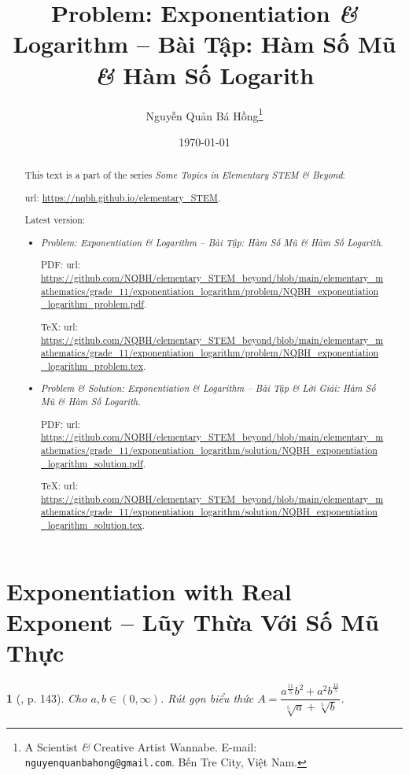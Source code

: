 \documentclass{article}
\title{Problem: Exponentiation {\it\&} Logarithm -- Bài Tập: Hàm Số Mũ {\it\&} Hàm Số Logarith}
\author{Nguyễn Quản Bá Hồng\footnote{A Scientist {\it\&} Creative Artist Wannabe. E-mail: {\tt nguyenquanbahong@gmail.com}. Bến Tre City, Việt Nam.}}
\date{\today}
\newtheorem{baitoan}{}
\begin{document}
\maketitle
\begin{abstract}
	This text is a part of the series {\it Some Topics in Elementary STEM \& Beyond}:
	
	{\sc url}: \url{https://nqbh.github.io/elementary_STEM}.
	
	Latest version:
	\begin{itemize}
		\item {\it Problem: Exponentiation \& Logarithm -- Bài Tập: Hàm Số Mũ \& Hàm Số Logarith}.
		
		PDF: {\sc url}: \url{https://github.com/NQBH/elementary_STEM_beyond/blob/main/elementary_mathematics/grade_11/exponentiation_logarithm/problem/NQBH_exponentiation_logarithm_problem.pdf}.
		
		\TeX: {\sc url}: \url{https://github.com/NQBH/elementary_STEM_beyond/blob/main/elementary_mathematics/grade_11/exponentiation_logarithm/problem/NQBH_exponentiation_logarithm_problem.tex}.
		\item {\it Problem \& Solution: Exponentiation \& Logarithm -- Bài Tập \& Lời Giải: Hàm Số Mũ \& Hàm Số Logarith}.
		
		PDF: {\sc url}: \url{https://github.com/NQBH/elementary_STEM_beyond/blob/main/elementary_mathematics/grade_11/exponentiation_logarithm/solution/NQBH_exponentiation_logarithm_solution.pdf}.
		
		\TeX: {\sc url}: \url{https://github.com/NQBH/elementary_STEM_beyond/blob/main/elementary_mathematics/grade_11/exponentiation_logarithm/solution/NQBH_exponentiation_logarithm_solution.tex}.
	\end{itemize}
\end{abstract}
\tableofcontents


\section{Exponentiation with Real Exponent -- Lũy Thừa Với Số Mũ Thực}

\begin{baitoan}[\cite{BTNC_Toan_11_DSGTXSTK}, p. 143]
	Cho $a,b\in(0,\infty)$. Rút gọn biểu thức $A = \dfrac{a^{\frac{11}{5}}b^2 + a^2b^{\frac{11}{5}}}{\sqrt[5]{a} + \sqrt[5]{b}}$.
\end{baitoan}
\end{document}
